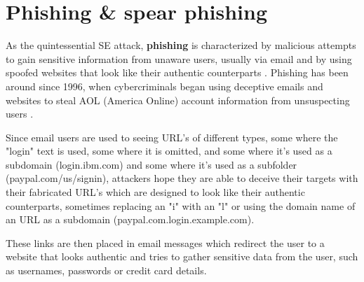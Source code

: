 
\section{Phishing \& spear phishing}
\begin{comment}
    
    - 

\end{comment}


As the quintessential SE attack, \textbf{phishing} is characterized by malicious attempts to gain sensitive information from unaware users, usually via email and by using spoofed websites that look like their authentic counterparts \citep{basitComprehensiveSurveyAIenabledPhishingAttacks2021}. Phishing has been around since 1996, when cybercriminals began using deceptive emails and websites to steal AOL (America Online) account information from unsuspecting users \citep{wangDefiningSocialEngineering2020}.


Since email users are used to seeing URL's of different types, some where the "login" text is used, some where it is omitted, and some where it's used as a subdomain (login.ibm.com) and some where it's used as a subfolder (paypal.com/us/signin), attackers hope they are able to deceive their targets with their fabricated URL's which are designed to look like their authentic counterparts, sometimes replacing an "i" with an "l" or using the domain name of an URL as a subdomain (paypal.com.login.example.com).

These links are then placed in email messages which redirect the user to a website that looks authentic and tries to gather sensitive data from the user, such as usernames, passwords or credit card details.

